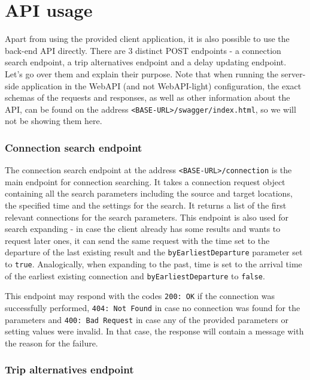 \section{API usage}

Apart from using the provided client application, it is also possible to use the back-end API directly. There are 3 distinct POST endpoints - a connection search endpoint, a trip alternatives endpoint and a delay updating endpoint. Let's go over them and explain their purpose. Note that when running the server-side application in the WebAPI (and not WebAPI-light) configuration, the exact schemas of the requests and responses, as well as other information about the API, can be found on the address \texttt{<BASE-URL>/swagger/index.html}, so we will not be showing them here.

\subsubsection{Connection search endpoint}
\label{subsec:connection_endpoint}

The connection search endpoint at the address \texttt{<BASE-URL>/connection} is the main endpoint for connection searching. It takes a connection request object containing all the search parameters including the source and target locations, the specified time and the settings for the search. It returns a list of the first relevant connections for the search parameters. This endpoint is also used for search expanding - in case the client already has some results and wants to request later ones, it can send the same request with the time set to the departure of the last existing result and the \texttt{byEarliestDeparture} parameter set to \texttt{true}. Analogically, when expanding to the past, time is set to the arrival time of the earliest existing connection and \texttt{byEarliestDeparture} to \texttt{false}.

This endpoint may respond with the codes \texttt{200: OK} if the connection was successfully performed, \texttt{404: Not Found} in case no connection was found for the parameters and \texttt{400: Bad Request} in case any of the provided parameters or setting values were invalid. In that case, the response will contain a message with the reason for the failure.

\subsubsection{Trip alternatives endpoint}

